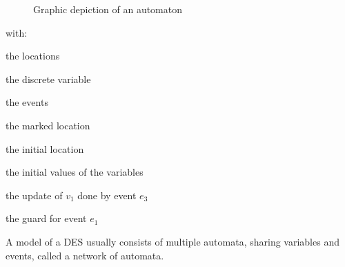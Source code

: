 \begin{figure}[!ht]
  \centering
  \caption{Graphic depiction of an automaton}\label{fig:automaton}
\end{figure}

with:
\begin{description}[\IEEEsetlabelwidth{\(e_1, e_2, e_3, e_4\)}]
  \item[\(l_1, l_2,l_3\)] the locations
  \item[\(v_1\)] the discrete variable
  \item[\(e_1, e_2, e_3, e_4\)] the events
  \item[\(l_3\)] the marked location
  \item[\(l_1\)] the initial location
  \item[\(v_1=0\)] the initial values of the variables
  \item[\(v_1 := v_1+1\)] the update of \(v_1\) done by event \(e_3\)
  \item[\(v_1 < 5\)] the guard for event \(e_1\)\\
\end{description}

A model of a DES usually consists of multiple automata, sharing variables and events, called a network of automata.\\

